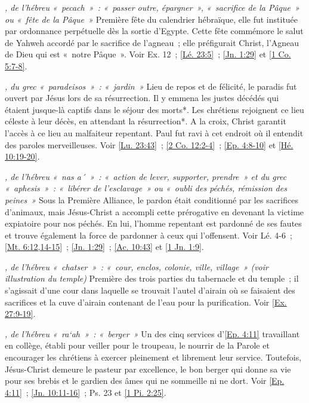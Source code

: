 \begin{multicols}{2}
\textit{, de l'hébreu «~pecach~»~: «~passer outre, épargner~», «~sacrifice de la Pâque~» ou «~fête de la Pâque~»}\newline
Première fête du calendrier hébraïque, elle fut instituée par ordonnance perpétuelle dès la sortie d'Egypte. Cette fête commémore le salut de Yahweh accordé par le sacrifice de l'agneau~; elle préfigurait Christ, l'Agneau de Dieu qui est «~notre Pâque~». Voir Ex. 12~; \vref{Lé. 23:5}~; \vref{Jn. 1:29} et \vref{1 Co. 5:7-8}.

\textit{, du grec «~paradeisos~»~: «~jardin~»}\newline
Lieu de repos et de félicité, le paradis fut ouvert par Jésus lors de sa résurrection. Il y emmena les justes décédés qui étaient jusque-là captifs dans le séjour des morts*. Les chrétiens rejoignent ce lieu céleste à leur décès, en attendant la résurrection*. A la croix, Christ garantit l'accès à ce lieu au malfaiteur repentant. Paul fut ravi à cet endroit où il entendit des paroles merveilleuses. Voir \vref{Lu. 23:43}~; \vref{2 Co. 12:2-4}~; \vref{Ep. 4:8-10} et \vref{Hé. 10:19-20}.

\textit{, de l'hébreu «~nas a´~»~: «~action de lever, supporter, prendre~» et du grec «~aphesis~»~: «~libérer de l'esclavage~» ou «~oubli des péchés, rémission des peines~»}\newline
Sous la Première Alliance, le pardon était conditionné par les sacrifices d'animaux, mais Jésus-Christ a accompli cette prérogative en devenant la victime expiatoire pour nos péchés. En lui, l'homme repentant est pardonné de ses fautes et trouve également la force de pardonner à ceux qui l'offensent. Voir Lé. 4-6~; \vref{Mt. 6:12,14-15}~; \vref{Jn. 1:29}~; \vref{Ac. 10:43} et \vref{1 Jn. 1:9}.

\textit{, de l'hébreu «~chatser~»~: «~cour, enclos, colonie, ville, village~» (voir illustration du temple)}\newline
Première des trois parties du tabernacle et du temple~; il s'agissait d'une cour dans laquelle se trouvait l'autel d'airain où se faisaient des sacrifices et la cuve d'airain contenant de l'eau pour la purification. Voir \vref{Ex. 27:9-19}.

\textit{, de l'hébreu «~ra`ah~»~: «~berger~»}\newline
Un des cinq services d'\vref{Ep. 4:11} travaillant en collège, établi pour veiller pour le troupeau, le nourrir de la Parole et encourager les chrétiens à exercer pleinement et librement leur service. Toutefois, Jésus-Christ demeure le pasteur par excellence, le bon berger qui donne sa vie pour ses brebis et le gardien des âmes qui ne sommeille ni ne dort. Voir \vref{Ep. 4:11}~; \vref{Jn. 10:11-16}~; Ps. 23 et \vref{1 Pi. 2:25}.


\end{multicols}

